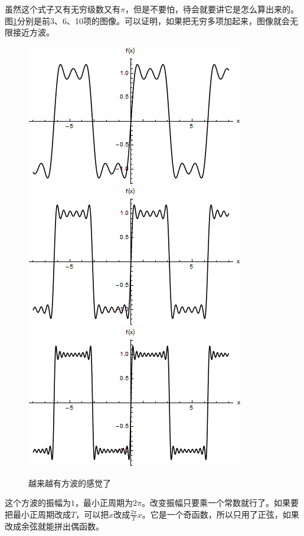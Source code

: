 虽然这个式子又有无穷级数又有$\pi$，但是不要怕，待会就要讲它是怎么算出来的。图\ref{fig-trigo-square-wave}分别是前$3$、$6$、10项的图像。可以证明，如果把无穷多项加起来，图像就会无限接近方波。
\begin{figure}[htb]
\centering
\includegraphics[scale=0.4]{fig/trigo-square-wave}
\includegraphics[scale=0.4]{fig/trigo-square-wave-2}
\includegraphics[scale=0.4]{fig/trigo-square-wave-3}
\caption{越来越有方波的感觉了}
\label{fig-trigo-square-wave}
\end{figure}

这个方波的振幅为$1$，最小正周期为$2 \pi$。改变振幅只要乘一个常数就行了。如果要把最小正周期改成$T$，可以把$x$改成$\frac{2 \pi}{T} x$。它是一个奇函数，所以只用了正弦，如果改成余弦就能拼出偶函数。

